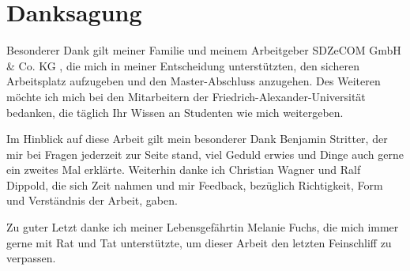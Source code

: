 \chapter*{Danksagung}

Besonderer Dank gilt meiner Familie und meinem Arbeitgeber SDZeCOM GmbH \& Co. KG , die mich in meiner Entscheidung unterstützten, den sicheren Arbeitsplatz aufzugeben und den Master-Abschluss anzugehen. Des Weiteren möchte ich mich bei den Mitarbeitern der Friedrich-Alexander-Universität bedanken, die täglich Ihr Wissen an Studenten wie mich weitergeben.

Im Hinblick auf diese Arbeit gilt mein besonderer Dank Benjamin Stritter, der mir bei Fragen jederzeit zur Seite stand, viel Geduld erwies und Dinge auch gerne ein zweites Mal erklärte. Weiterhin danke ich Christian Wagner und Ralf Dippold, die sich Zeit nahmen und mir Feedback, bezüglich Richtigkeit, Form und Verständnis der Arbeit, gaben.

Zu guter Letzt danke ich meiner Lebensgefährtin Melanie Fuchs, die mich immer gerne mit Rat und Tat unterstützte, um dieser Arbeit den letzten Feinschliff zu verpassen.